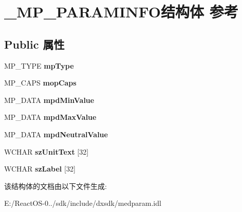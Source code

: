 \hypertarget{struct___m_p___p_a_r_a_m_i_n_f_o}{}\section{\+\_\+\+M\+P\+\_\+\+P\+A\+R\+A\+M\+I\+N\+F\+O结构体 参考}
\label{struct___m_p___p_a_r_a_m_i_n_f_o}
\subsection*{Public 属性}
\begin{DoxyCompactItemize}
\item 
\mbox{\label{struct___m_p___p_a_r_a_m_i_n_f_o_ab84c1a17b982e917a1ff3124f42c1dac}} 
M\+P\+\_\+\+T\+Y\+PE {\bfseries mp\+Type}
\item 
\mbox{\label{struct___m_p___p_a_r_a_m_i_n_f_o_aa8fc01964a765b036a1600afa58fd3e0}} 
M\+P\+\_\+\+C\+A\+PS {\bfseries mop\+Caps}
\item 
\mbox{\label{struct___m_p___p_a_r_a_m_i_n_f_o_ade1eede695f98ad5a9cb6b9184619d1a}} 
M\+P\+\_\+\+D\+A\+TA {\bfseries mpd\+Min\+Value}
\item 
\mbox{\label{struct___m_p___p_a_r_a_m_i_n_f_o_acb9aba3e24d7cef3f7b7d1a562f706a1}} 
M\+P\+\_\+\+D\+A\+TA {\bfseries mpd\+Max\+Value}
\item 
\mbox{\label{struct___m_p___p_a_r_a_m_i_n_f_o_a2dd9f70e1886bd621d840fcf95207924}} 
M\+P\+\_\+\+D\+A\+TA {\bfseries mpd\+Neutral\+Value}
\item 
\mbox{\label{struct___m_p___p_a_r_a_m_i_n_f_o_a1c2822e05332184cb25635bf2d40d842}} 
W\+C\+H\+AR {\bfseries sz\+Unit\+Text} \mbox{[}32\mbox{]}
\item 
\mbox{\label{struct___m_p___p_a_r_a_m_i_n_f_o_a42ac3cb8431b53b659de84bad6acf9f8}} 
W\+C\+H\+AR {\bfseries sz\+Label} \mbox{[}32\mbox{]}
\end{DoxyCompactItemize}


该结构体的文档由以下文件生成\+:\begin{DoxyCompactItemize}
\item 
E\+:/\+React\+O\+S-\/0../sdk/include/dxsdk/medparam.\+idl\end{DoxyCompactItemize}
